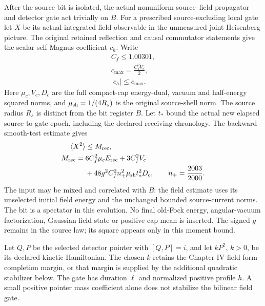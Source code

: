 After the source bit is isolated, the actual nonuniform source--field
propagator and detector gate act trivially on $B$. For a prescribed
source-excluding local gate let $X$ be its actual integrated field
observable in the unmeasured joint Heisenberg picture. The original
retained reflection and causal commutator statements give the scalar
self-Magnus coefficient $c_h$. Write
\begin{equation}
\begin{gathered}
C_f\leq1.00301,\\
 c_{\max}=\frac{C_f^2V_c}{2},\\
 |c_h|\leq c_{\max}.
\end{gathered}
\label{eq:chvidr-pointer-magnus-bound}
\end{equation}
Here $\mu_c,V_c,D_c$ are the full compact-cap energy-dual, vacuum and
half-energy squared norms, and $\mu_{\rm sh}=1/(4R_s)$ is the original
source-shell norm. The source radius $R_s$ is distinct from the bit
register $B$. Let $t_*$ bound the actual new elapsed source-to-gate epoch,
including the declared receiving chronology. The backward smooth-test
estimate gives
\begin{equation}
 \begin{aligned}
 \langle X^2\rangle&\leq M_{\rm rec},\\
 M_{\rm rec}={}&6C_f^2\mu_c E_{\rm rec}+3C_f^2V_c\\
   &+48g^2C_f^2 n_+^2\mu_{\rm sh}t_*^2D_c,
 \qquad n_+=\frac{2003}{2000}.
 \end{aligned}
 \label{eq:chvidr-actual-field-second-moment}
\end{equation}
The input may be mixed and correlated with $B$: the field estimate uses
its unselected initial field energy and the unchanged bounded source-current
norms. The bit is a spectator in this evolution. No final old-Fock energy,
angular-vacuum factorization, Gaussian field state or positive cap mean
is inserted. The signed $g$ remains in the source law; its square appears
only in this moment bound.

Let $Q,P$ be the selected detector pointer with $[Q,P]=i$, and let
$kP^2$, $k>0$, be its declared kinetic Hamiltonian. The chosen $k$ retains
the Chapter IV field-form completion margin, or that margin is supplied
by the additional quadratic stabilizer below. The gate has duration
$\ell$ and normalized positive profile $h$. A small positive pointer mass
coefficient alone does not stabilize the bilinear field gate.

